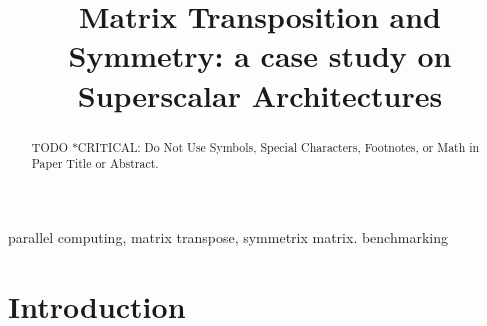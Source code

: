 \documentclass[conference]{IEEEtran}
\begin{document}
\title{Matrix Transposition and Symmetry: a case study on Superscalar Architectures\\
}

\author{
}

\maketitle

\begin{abstract}
TODO *CRITICAL: Do Not Use Symbols, Special Characters, Footnotes, 
or Math in Paper Title or Abstract.
\end{abstract}

\begin{IEEEkeywords}
parallel computing, matrix transpose, symmetrix matrix. benchmarking
\end{IEEEkeywords}

\section{Introduction}
\end{document}
